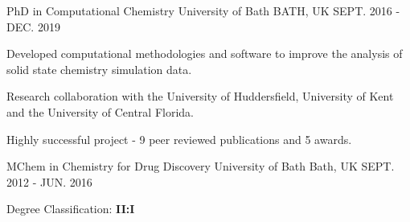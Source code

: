 \begin{cventries}
  \cventry
    {PhD in Computational Chemistry}
    {University of Bath}
    {BATH, UK}
    {SEPT. 2016 - DEC. 2019}
    {
      \begin{cvitems}
        \item {Developed computational methodologies and software to improve the analysis of solid state chemistry simulation data.}
        \item {Research collaboration with the University of Huddersfield, University of Kent and the University of Central Florida.}
        \item {Highly successful project - 9 peer reviewed publications and 5 awards.}
      \end{cvitems}
    }
  \cventry
    {MChem in Chemistry for Drug Discovery}
    {University of Bath}
    {Bath, UK}
    {SEPT. 2012 - JUN. 2016}
    {
      \begin{cvitems}
        \item {Degree Classification: \textbf{II:I}}
      \end{cvitems}
    }
\end{cventries}


